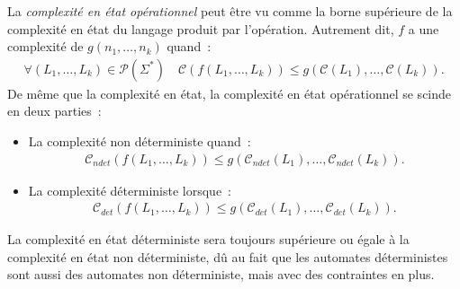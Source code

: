 \begin{definition}
  La \textit{complexité en état opérationnel} peut être vu comme la borne
  supérieure de la complexité en état du langage produit par l'opération.
  Autrement dit, \(f\) a une complexité de \(g(n_1, \ldots, n_k)\) quand~:
  \begin{align*}
    \forall (L_1, \ldots, L_k) \in \mathcal{P}(\Sigma^*) \quad
    \mathcal{C}(f(L_1, \ldots, L_k)) \leq 
    g(\mathcal{C}(L_1), \ldots, \mathcal{C}(L_k)).
  \end{align*}
  De même que la complexité en état, la complexité en état opérationnel se
  scinde en deux parties~:

  \vphantom{}

  \begin{itemize}
    \item[\bullet] La complexité non déterministe quand~:
    \begin{align*}
      \mathcal{C}_{ndet}(f(L_1, \ldots, L_k)) \leq 
      g(\mathcal{C}_{ndet}(L_1), \ldots, \mathcal{C}_{ndet}(L_k)).
    \end{align*}
    \item[\bullet] La complexité déterministe lorsque~:
    \begin{align*}
      \mathcal{C}_{det}(f(L_1, \ldots, L_k)) \leq 
      g(\mathcal{C}_{det}(L_1), \ldots, \mathcal{C}_{det}(L_k)).
    \end{align*}
  \end{itemize}
\end{definition}

\begin{remark}
  La complexité en état déterministe sera toujours supérieure ou égale à la
  complexité en état non déterministe, dû au fait que les automates
  déterministes sont aussi des automates non déterministe, mais avec des
  contraintes en plus.
\end{remark}

